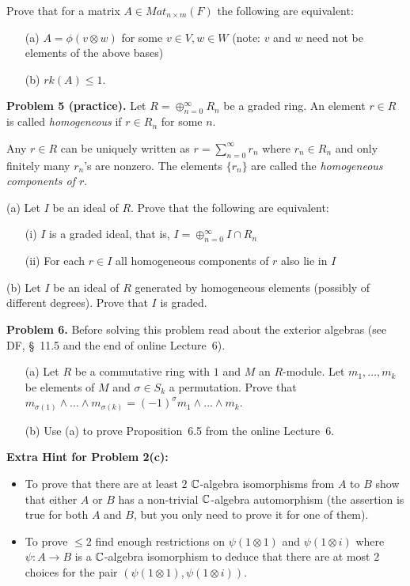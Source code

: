 \documentclass[12pt]{amsart}
\begin{document}
Prove that for a matrix $A\in Mat_{n\times m}(F)$ the following are equivalent:
\begin{itemize}
\item[(a)] $A=\phi(v\otimes w)$ for some $v\in V, w\in W$ (note: $v$ and $w$
need not be elements of the above bases)

\item[(b)] $rk(A)\leq 1$.
\end{itemize}

{\bf Problem 5 (practice).} Let $R=\oplus_{n=0}^{\infty} R_n$ be a graded ring.
An element $r\in R$ is called \emph{homogeneous} if $r\in R_n$
for some $n$. 

\sk Any $r\in R$ can be uniquely written as $r=\sum_{n=0}^{\infty} r_n$
where $r_n\in R_n$ and only finitely many $r_n$'s are nonzero. The elements
$\{r_n\}$ are called the \emph{homogeneous components of $r$}.

(a) Let $I$ be an ideal of $R$. Prove that the following are equivalent:
\begin{itemize}
\item[(i)] $I$ is a graded ideal, that is, $I=\oplus_{n=0}^{\infty} I\cap R_n$  
\item[(ii)] For each $r\in I$ all homogeneous components of $r$ also lie in $I$
\end{itemize}

(b) Let $I$ be an ideal of $R$ generated by homogeneous elements
(possibly of different degrees). Prove that $I$ is graded.

\skv
{\bf Problem 6.} Before solving this problem read about the exterior algebras (see DF, \S~11.5 and the end of online Lecture~6).
\begin{itemize}
\item[(a)] Let $R$ be a commutative ring with $1$ and $M$ an $R$-module.
Let $m_1,\ldots, m_k$ be elements of $M$ and $\sigma\in S_k$ a permutation.
Prove that $m_{\sigma(1)}\wedge\ldots\wedge m_{\sigma(k)}=(-1)^{\sigma}
m_1\wedge\ldots \wedge m_k$.
\item[(b)] Use (a) to prove Proposition~6.5 from the online Lecture~6.
\end{itemize}
\newpage
{\bf Extra Hint for Problem 2(c):} 
\begin{itemize}
\item To prove that there are at least $2$ ${\mathbb C}$-algebra isomorphisms from $A$ to $B$ show that either $A$ or $B$ has a non-trivial ${\mathbb C}$-algebra automorphism (the assertion is true for both $A$ and $B$, but you only need to prove it for one of them). 

\item
To prove $\leq 2$ find enough restrictions on $\psi(1\otimes 1)$ and 
$\psi(1\otimes i)$ where $\psi:A\to B$ is a ${\mathbb C}$-algebra isomorphism to deduce that there are at most $2$ choices
for the pair $(\psi(1\otimes 1), \psi(1\otimes i))$.
\end{itemize}
\end{document}
